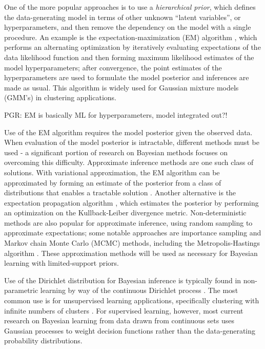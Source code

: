 \documentclass[12pt]{article}
\begin{document}
One of the more popular approaches is to use a \emph{hierarchical prior}, which defines the data-generating model in terms of other unknown ``latent variables'', or hyperparameters, and then remove the dependency on the model with a single procedure. An example is the expectation-maximization (EM) algorithm \cite{dempster}, which performs an alternating optimization by iteratively evaluating expectations of the data likelihood function and then forming maximum likelihood estimates of the model hyperparameters; after convergence, the point estimates of the hyperparameters are used to formulate the model posterior and inferences are made as usual. This algorithm is widely used for Gaussian mixture models (GMM's) in clustering applications.

PGR: EM is basically ML for hyperparameters, model integrated out?!

Use of the EM algorithm requires the model posterior given the observed data. When evaluation of the model posterior is intractable, different methods must be used - a significant portion of research on Bayesian methods focuses on overcoming this difficulty. Approximate inference methods are one such class of solutions. With variational approximation, the EM algorithm can be approximated by forming an estimate of the posterior from a class of distributions that enables a tractable solution \cite{beal}. Another alternative is the expectation propagation algorithm \cite{minka-ep}, which estimates the posterior by performing an optimization on the Kullback-Leiber divergence metric. Non-deterministic methods are also popular for approximate inference, using random sampling to approximate expectations; some notable approaches are importance sampling \cite{mackay-is} and Markov chain Monte Carlo (MCMC) methods, including the Metropolis-Hastings algorithm \cite{hastings}. These approximation methods will be used as necessary for Bayesian learning with limited-support priors.


Use of the Dirichlet distribution for Bayesian inference is typically found in non-parametric learning by way of the continuous Dirichlet process \cite{ferguson}. The most common use is for unsupervised learning applications, specifically clustering with infinite numbers of clusters \cite{gershman}. For supervised learning, however, most current research on Bayesian learning from data drawn from continuous sets uses Gaussian processes \cite{rasmussen,meeds} to weight decision functions rather than the data-generating probability distributions.
\end{document}
